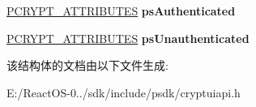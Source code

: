 \begin{DoxyCompactItemize}
\item 
\mbox{\label{struct___c_r_y_p_t_u_i___w_i_z___d_i_g_i_t_a_l___s_i_g_n___e_x_t_e_n_d_e_d___i_n_f_o_a04f1e9b182cf1d67fc299f7af729fb0a}} 
\hyperlink{struct___c_r_y_p_t___a_t_t_r_i_b_u_t_e_s}{P\+C\+R\+Y\+P\+T\+\_\+\+A\+T\+T\+R\+I\+B\+U\+T\+ES} {\bfseries ps\+Authenticated}
\item 
\mbox{\label{struct___c_r_y_p_t_u_i___w_i_z___d_i_g_i_t_a_l___s_i_g_n___e_x_t_e_n_d_e_d___i_n_f_o_a18895a32862470b73836db440594738b}} 
\hyperlink{struct___c_r_y_p_t___a_t_t_r_i_b_u_t_e_s}{P\+C\+R\+Y\+P\+T\+\_\+\+A\+T\+T\+R\+I\+B\+U\+T\+ES} {\bfseries ps\+Unauthenticated}
\end{DoxyCompactItemize}


该结构体的文档由以下文件生成\+:\begin{DoxyCompactItemize}
\item 
E\+:/\+React\+O\+S-\/0../sdk/include/psdk/cryptuiapi.\+h\end{DoxyCompactItemize}
